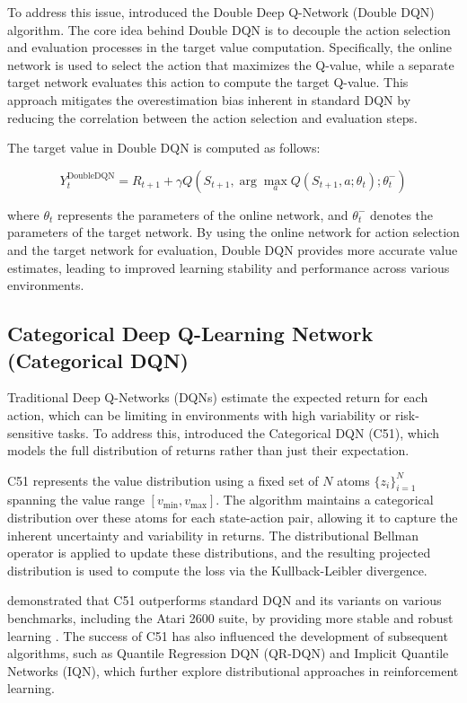 \documentclass{article} %
\begin{document}
To address this issue, \cite{van2016deep} introduced the Double Deep Q-Network (Double DQN) algorithm. The core idea behind Double DQN is to decouple the action selection and evaluation processes in the target value computation. Specifically, the online network is used to select the action that maximizes the Q-value, while a separate target network evaluates this action to compute the target Q-value. This approach mitigates the overestimation bias inherent in standard DQN by reducing the correlation between the action selection and evaluation steps.

The target value in Double DQN is computed as follows:

\[
  Y_t^{\text{DoubleDQN}} = R_{t+1} + \gamma Q\left(S_{t+1}, \arg\max_a Q(S_{t+1}, a; \theta_t); \theta_t^{-}\right)
\]

where $\theta_t$ represents the parameters of the online network, and $\theta_t^{-}$ denotes the parameters of the target network. By using the online network for action selection and the target network for evaluation, Double DQN provides more accurate value estimates, leading to improved learning stability and performance across various environments.

\subsection{Categorical Deep Q-Learning Network (Categorical DQN)}

Traditional Deep Q-Networks (DQNs) estimate the expected return for each action, which can be limiting in environments with high variability or risk-sensitive tasks. To address this, \cite{bellemare2017distributional} introduced the Categorical DQN (C51), which models the full distribution of returns rather than just their expectation.

C51 represents the value distribution using a fixed set of $N$ atoms $\{z_i\}_{i=1}^N$ spanning the value range $[v_{\min}, v_{\max}]$. The algorithm maintains a categorical distribution over these atoms for each state-action pair, allowing it to capture the inherent uncertainty and variability in returns. The distributional Bellman operator is applied to update these distributions, and the resulting projected distribution is used to compute the loss via the Kullback-Leibler divergence.

\cite{bellemare2017distributional} demonstrated that C51 outperforms standard DQN and its variants on various benchmarks, including the Atari 2600 suite, by providing more stable and robust learning . The success of C51 has also influenced the development of subsequent algorithms, such as Quantile Regression DQN (QR-DQN) and Implicit Quantile Networks (IQN), which further explore distributional approaches in reinforcement learning.
\end{document}
